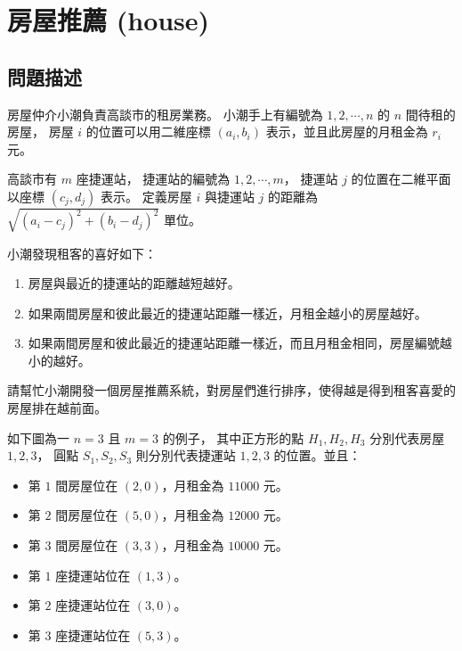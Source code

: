 \section{房屋推薦 (house)}

\subsection{問題描述}

房屋仲介小潮負責高談市的租房業務。 小潮手上有編號為 \(1, 2, \cdots, n\)
的 \(n\) 間待租的房屋， 房屋 \(i\) 的位置可以用二維座標 \((a_i, b_i)\)
表示，並且此房屋的月租金為 \(r_i\) 元。

高談市有 \(m\) 座捷運站， 捷運站的編號為 \(1, 2, \cdots, m\)， 捷運站
\(j\) 的位置在二維平面以座標 \((c_j, d_j)\) 表示。 定義房屋 \(i\)
與捷運站 \(j\) 的距離為 \(\sqrt{(a_i - c_j)^2 + (b_i - d_j)^2}\) 單位。

小潮發現租客的喜好如下：

\begin{enumerate}
\def\labelenumi{\arabic{enumi}.}
\tightlist
\item
  房屋與最近的捷運站的距離越短越好。
\item
  如果兩間房屋和彼此最近的捷運站距離一樣近，月租金越小的房屋越好。
\item
  如果兩間房屋和彼此最近的捷運站距離一樣近，而且月租金相同，房屋編號越小的越好。
\end{enumerate}

請幫忙小潮開發一個房屋推薦系統，對房屋們進行排序，使得越是得到租客喜愛的房屋排在越前面。

如下圖為一 \(n=3\) 且 \(m=3\) 的例子， 其中正方形的點 \(H_1, H_2, H_3\)
分別代表房屋 \(1, 2, 3\)， 圓點 \(S_1, S_2, S_3\) 則分別代表捷運站
\(1, 2, 3\) 的位置。並且：

\begin{itemize}
\tightlist
\item
  第 \(1\) 間房屋位在 \((2, 0)\)，月租金為 \(11000\) 元。
\item
  第 \(2\) 間房屋位在 \((5, 0)\)，月租金為 \(12000\) 元。
\item
  第 \(3\) 間房屋位在 \((3, 3)\)，月租金為 \(10000\) 元。
\item
  第 \(1\) 座捷運站位在 \((1, 3)\)。
\item
  第 \(2\) 座捷運站位在 \((3, 0)\)。
\item
  第 \(3\) 座捷運站位在 \((5, 3)\)。
\end{itemize}

